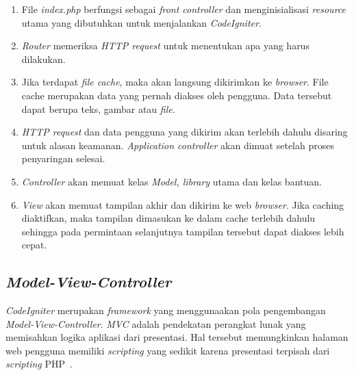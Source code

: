 \begin{enumerate}
	\item File \textit{index.php} berfungsi sebagai \textit{front controller} dan menginisialisasi \textit{resource} utama yang dibutuhkan untuk menjalankan \textit{CodeIgniter}.
	\item \textit{Router} memeriksa \textit{HTTP request} untuk menentukan apa yang harus dilakukan.
	\item Jika terdapat \textit{file cache}, maka akan langsung dikirimkan ke \textit{browser}. File cache merupakan data yang pernah diakses oleh pengguna. Data tersebut dapat berupa teks, gambar atau \textit{file}. 
	\item \textit{HTTP request} dan data pengguna yang dikirim akan terlebih dahulu disaring untuk alasan keamanan. \textit{Application controller} akan dimuat setelah proses penyaringan selesai.
	\item \textit{Controller} akan memuat kelas \textit{Model, library} utama dan kelas bantuan.
	\item \textit{View} akan memuat tampilan akhir dan dikirim ke web \textit{browser}. Jika caching diaktifkan, maka tampilan dimasukan ke dalam cache terlebih dahulu sehingga pada permintaan selanjutnya tampilan tersebut dapat diakses lebih cepat.
\end{enumerate}

\subsection{\textit{Model-View-Controller}}
\label{sec:mvc}
\textit{CodeIgniter} merupakan \textit{framework} yang menggunaakan pola pengembangan \textit{Model-View-Controller}. \textit{MVC} adalah pendekatan perangkat lunak yang memisahkan logika aplikasi dari presentasi. Hal tersebut memungkinkan halaman web pengguna memiliki \textit{scripting} yang sedikit karena presentasi terpisah dari \textit{scripting} PHP~\cite{bcit:17:cidoc}. \\

